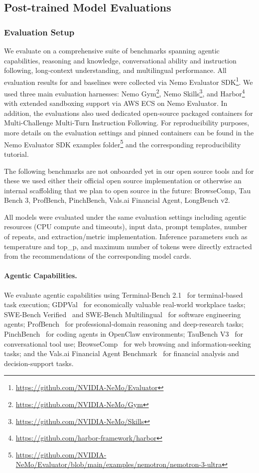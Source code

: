 \subsection{Post-trained Model Evaluations}
\label{subsec:final_model_evals}
\subsubsection{Evaluation Setup}

We evaluate \ourmodel on a comprehensive suite of benchmarks spanning agentic capabilities, reasoning and knowledge, conversational ability and instruction following, long-context understanding, and multilingual performance.
All evaluation results for \ourmodel and baselines were collected via Nemo Evaluator SDK\footnote{\url{https://github.com/NVIDIA-NeMo/Evaluator}}. We used three main evaluation harnesses: Nemo Gym\footnote{\url{https://github.com/NVIDIA-NeMo/Gym}}, Nemo Skills\footnote{\url{https://github.com/NVIDIA-NeMo/Skills}}, and Harbor\footnote{\url{https://github.com/harbor-framework/harbor}} with extended sandboxing support via AWS ECS on Nemo Evaluator. In addition, the evaluations also used dedicated open-source packaged containers for Multi-Challenge Multi-Turn Instruction Following. For reproducibility purposes, more details on the evaluation settings and pinned containers can be found in the Nemo Evaluator SDK examples folder\footnote{\url{https://github.com/NVIDIA-NeMo/Evaluator/blob/main/examples/nemotron/nemotron-3-ultra}} and the corresponding reproducibility tutorial.

The following benchmarks are not onboarded yet in our open source tools and for these we used either their official open source implementation or otherwise an internal scaffolding that we plan to open source in the future: BrowseComp, Tau Bench 3, ProfBench, PinchBench, Vals.ai Financial Agent, LongBench v2.

All models were evaluated under the same evaluation settings including agentic resources (CPU compute and timeouts), input data, prompt templates, number of repeats, and extraction/metric implementation. Inference parameters such as temperature and top\_p, and maximum number of tokens were directly extracted from the recommendations of the corresponding model cards. 

\paragraph{Agentic Capabilities.}
We evaluate agentic capabilities using Terminal-Bench 2.1~\citep{merrill2026terminal} for terminal-based task execution; GDPVal~\citep{patwardhan2025gdpval} for economically valuable real-world workplace tasks; SWE-Bench Verified~\citep{jimenez2023swe} and SWE-Bench Multilingual~\citep{jimenez2023swe} for software engineering agents; ProfBench~\citep{wang2026profbench} for professional-domain reasoning and deep-research tasks; PinchBench~\citep{pinchbench_skill2026} for coding agents in OpenClaw environments; TauBench V3~\citep{barres2025tau} for conversational tool use; BrowseComp~\citep{wei2025browsecomp} for web browsing and information-seeking tasks; and the Vals.ai Financial Agent Benchmark~\citep{bigeard2025finance} for financial analysis and decision-support tasks.

